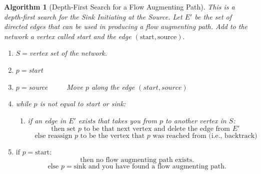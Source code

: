 \documentclass[10pt,]{book}
\theoremstyle{plain}
\newtheorem{algorithm}[theorem]{Algorithm}
\theoremstyle{definition}
\theoremstyle{definition}
\theoremstyle{definition}
\theoremstyle{definition}
\theoremstyle{definition}
\numberwithin{equation}{section}
\begin{document}
\begin{algorithm}[Depth-First Search for a Flow Augmenting Path]\label{alg-depth-first-search}
 This is a  depth-first search for the Sink Initiating at the Source. Let \(E'\) be the set of directed edges that can be used in producing a flow augmenting path. Add to the network a vertex called  start and the edge \((\text{start}, \text{source}).\)%
\par
\leavevmode%
\begin{enumerate}[label=\arabic*]
\item\hypertarget{li-93}{}\(S = \)vertex set of the network.%
\item\hypertarget{li-94}{}\(p= \)start%
\item\hypertarget{li-95}{}\(p = \)source \(\quad \quad\)  Move \(p\) along the edge \((start, source)\) %
\item\hypertarget{li-96}{}while \(p\) is not equal to  start or  sink:%
\par
%
\begin{enumerate}[label=\alph*]
\item\hypertarget{li-97}{}if an edge in \(E'\) exists that takes you from \(p\) to another vertex in \(S\):
\begin{equation*}\quad \text{then set } p \text{ to be that next vertex and delete the edge from } E'\end{equation*}
\begin{equation*}\quad \text{else reassign }p \text{ to be the vertex that }p\text{ was reached from (i.e., backtrack)}\end{equation*}%
\end{enumerate}
%
\item\hypertarget{li-98}{}\(\text{if } p = \text{start:}\) 
		\begin{equation*}\text{ then no flow augmenting path exists.}\end{equation*}
		\begin{equation*}\text{ else }p = \text{sink and you have found a flow augmenting path.}\end{equation*}
%
\end{enumerate}
%
\end{algorithm}
\end{document}
